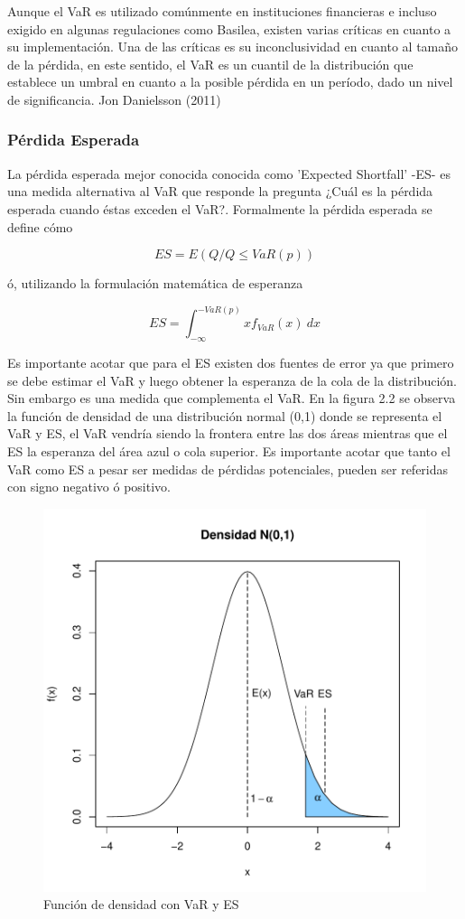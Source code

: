 \documentclass[a4paper,12pt]{Latex/Classes/PhDthesisPSnPDF}
\begin{document}
Aunque el VaR es utilizado comúnmente en instituciones financieras e incluso exigido en algunas regulaciones como Basilea, existen varias críticas en cuanto a su implementación. Una de las críticas es su inconclusividad en cuanto al tamaño de la pérdida, en este sentido, el VaR es un cuantil de la distribución que establece un umbral en cuanto a la posible pérdida en un período, dado un nivel de significancia. Jon Danielsson (2011)

\subsubsection{Pérdida Esperada}

La pérdida esperada mejor conocida conocida como 'Expected Shortfall' -ES- es una medida alternativa al VaR que responde la pregunta ¿Cuál es la pérdida esperada cuando éstas exceden el VaR?. Formalmente la pérdida esperada se define cómo

$$ ES = E(Q/Q \leq VaR(p)) $$ 

ó, utilizando la formulación matemática de esperanza

$$ ES = \int_{-\infty}^{-VaR(p)} xf_{VaR}(x)\ dx $$

Es importante acotar que para el ES existen dos fuentes de error ya que primero se debe estimar el VaR y luego obtener la esperanza de la cola de la distribución. Sin embargo es una medida que complementa el VaR. En la figura 2.2 se observa la función de densidad de una distribución normal (0,1) donde se representa el VaR y ES, el VaR vendría siendo la frontera entre las dos áreas mientras que el ES la esperanza del área azul o cola superior.
Es importante acotar que tanto el VaR como ES a pesar ser medidas de pérdidas potenciales, pueden ser referidas con signo negativo ó positivo.

\begin{figure}[H]
\centering
\includegraphics{main-001}
\caption{Función de densidad con VaR y ES}
\end{figure}
\end{document}
